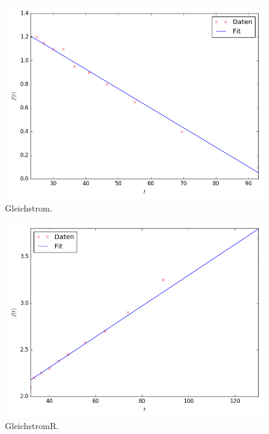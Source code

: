 \begin{figure}
	\centering
	\includegraphics{Gleichstrom.png}
	\caption{Gleichstrom.}
	\label{fig:Gleichstrom}
\end{figure}


\begin{figure}
	\centering
	\includegraphics{GleichstromR.png}
	\caption{GleichstromR.}
	\label{fig:GleichstromR}
\end{figure}

 
